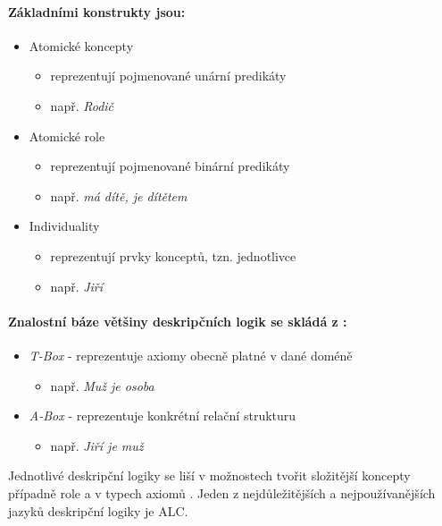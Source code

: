 \paragraph{Základními konstrukty jsou:}
\begin{itemize}
\item Atomické koncepty
\begin{itemize}
\item reprezentují pojmenované unární predikáty
\item např. \textit{Rodič}
\end{itemize}
\item Atomické role
\begin{itemize}
\item reprezentují pojmenované binární predikáty
\item např. \textit{má dítě, je dítětem}
\end{itemize}
\item Individuality
\begin{itemize}
\item reprezentují prvky konceptů, tzn. jednotlivce
\item např. \textit{Jiří} \cite{Kremen2011}
\end{itemize}
\end{itemize}
\paragraph{Znalostní báze většiny deskripčních logik se skládá z \cite{Stephan2007}:}
\begin{itemize}
\item \textit{T-Box} - reprezentuje axiomy obecně platné v dané doméně
\begin{itemize}
\item např. \textit{Muž je osoba}
\end{itemize}
\item \textit{A-Box} - reprezentuje konkrétní relační strukturu
\begin{itemize}
\item např. \textit{Jiří je muž} \cite{Kremen2011}
\end{itemize}
\end{itemize}
Jednotlivé deskripční logiky se liší v možnostech tvořit složitější koncepty případně role a v typech axiomů \cite{Kremen2011}.
Jeden z nejdůležitějších a nejpoužívanějších jazyků deskripční logiky je ALC. \cite{Stephan2007}



